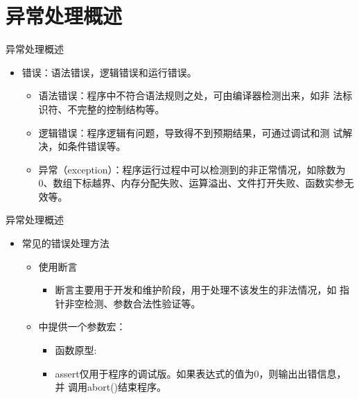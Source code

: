 \section[概述]{异常处理概述}\label{sec:chap10-sec01}
\begin{frame}[t, fragile]{异常处理概述}%
  \begin{itemize}
  \item 错误：语法错误，逻辑错误和运行错误。
    \begin{itemize}
      \scriptsize
    \item 语法错误：程序中不符合语法规则之处，可由编译器检测出来，如非
      法标识符、不完整的控制结构等。
    \item 逻辑错误：程序逻辑有问题，导致得不到预期结果，可通过调试和测
      试解决，如条件错误等。
    \item \alert{异常（exception）}：程序运行过程中可以检测到的非正常情况，如除数为0、数组下标越界、内存分配失败、运算溢出、文件打开失败、函数实参无效等。
    \end{itemize}
  \end{itemize}  
\end{frame}

\begin{frame}[t, fragile]{异常处理概述}%
  \begin{itemize}
  \item 常见的错误处理方法
    \begin{itemize}      
    \item 使用断言
      \begin{itemize}
      \item 断言主要用于开发和维护阶段，用于处理不该发生的非法情况，如
        指针非空检测、参数合法性验证等。      
      \end{itemize}
    \item {}中提供一个参数宏：
  \begin{itemize}
  \item 函数原型: 
  \item assert仅用于程序的调试版。如果表达式的值为0，则输出出错信息，并
    调用abort()结束程序。
  \end{itemize}  
  \end{itemize}  
\end{itemize}
\end{frame}

